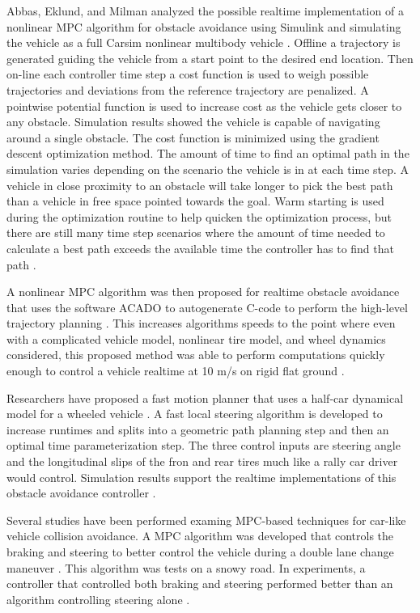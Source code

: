 \documentclass[12pt,onecolumn]{article}
\begin{document}
Abbas, Eklund, and Milman analyzed the possible realtime implementation of a nonlinear MPC algorithm for obstacle avoidance using Simulink and simulating the vehicle as a full Carsim nonlinear multibody vehicle \cite{Abbas&Eklund2012}. Offline a trajectory is generated guiding the vehicle from a start point to the desired end location. Then on-line each controller time step a cost function is used to weigh possible trajectories and deviations from the reference trajectory are penalized. A pointwise potential function is used to increase cost as the vehicle gets closer to any obstacle. Simulation results showed the vehicle is capable of navigating around a single obstacle. The cost function is minimized using the gradient descent optimization method. The amount of time to find an optimal path in the simulation varies depending on the scenario the vehicle is in at each time step. A vehicle in close proximity to an obstacle will take longer to pick the best path than a vehicle in free space pointed towards the goal. Warm starting is used during the optimization routine to help quicken the optimization process, but there are still many time step scenarios where the amount of time needed to calculate a best path exceeds the available time the controller has to find that path \cite{Abbas&Eklund2012}.

A nonlinear MPC algorithm was then proposed for realtime obstacle avoidance that uses the software ACADO to autogenerate C-code to perform the high-level trajectory planning \cite{Frasch&Gray2013}. This increases algorithms speeds to the point where even with a complicated vehicle model, nonlinear tire model, and wheel dynamics considered, this proposed method was able to perform computations quickly enough to control a vehicle realtime at 10 m/s on rigid flat ground \cite{Frasch&Gray2013}.

Researchers have proposed a fast motion planner that uses a half-car dynamical model for a wheeled vehicle \cite{Jeon&Cowlagi2013}. A fast local steering algorithm is developed to increase runtimes and splits into a geometric path planning step and then an optimal time parameterization step. The three control inputs are steering angle and the longitudinal slips of the fron and rear tires much like a rally car driver would control. Simulation results support the realtime implementations of this obstacle avoidance controller \cite{Jeon&Cowlagi2013}.

Several studies have been performed examing MPC-based techniques for car-like vehicle collision avoidance. A MPC algorithm was developed that controls the braking and steering to better control the vehicle during a double lane change maneuver \cite{Falcone2007}. This algorithm was tests on a snowy road. In experiments, a controller that controlled both braking and steering performed better than an algorithm controlling steering alone \cite{Falcone2007}.
\end{document}
